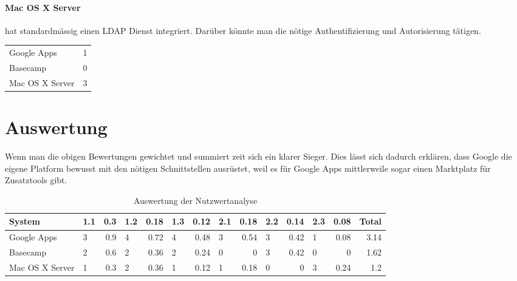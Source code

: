 \paragraph{Mac OS X Server}
\label{par:2.3Mac OS X Server}
hat standardmässig einen LDAP Dienst integriert. Darüber könnte man die nötige Authentifizierung und Autorisierung tätigen.

\begin{tabular}{lc}
Google Apps & 1\\
Basecamp & 0\\
Mac OS X Server & 3\\
\end{tabular}

\section{Auswertung}
\label{sec:Auswertung}
Wenn man die obigen Bewertungen gewichtet und summiert zeit sich ein klarer Sieger. Dies lässt sich dadurch erklären, dass Google die eigene Platform bewusst mit den nötigen Schnittstellen ausrüstet, weil es für Google Apps mittlerweile sogar einen Marktplatz für Zusatztools gibt.

\begin{table}[h!]
  \centering
  \begin{tabular}{|l|lr|lr|lr|lr|lr|lr|r|}
  \hline
  System & 1.1 & 0.3 & 1.2 & 0.18 & 1.3 & 0.12 & 2.1 & 0.18 & 2.2 & 0.14 & 2.3 & 0.08 & Total\\
  \hline
  Google Apps & 3 & 0.9 & 4 & 0.72 & 4 & 0.48 & 3 & 0.54 & 3 & 0.42 & 1 & 0.08 & 3.14\\
  \hline
  Basecamp & 2 & 0.6 & 2 & 0.36 & 2 & 0.24 & 0 & 0 & 3 & 0.42 & 0 & 0 & 1.62\\
  \hline
  Mac OS X Server & 1 & 0.3 & 2 & 0.36 & 1 & 0.12 & 1 & 0.18 & 0 & 0 & 3 & 0.24 & 1.2\\
  \hline
  \end{tabular}
  \caption{Auswertung der Nutzwertanalyse}
  \label{tab:auswertung_nutzwertanalyse}
\end{table}